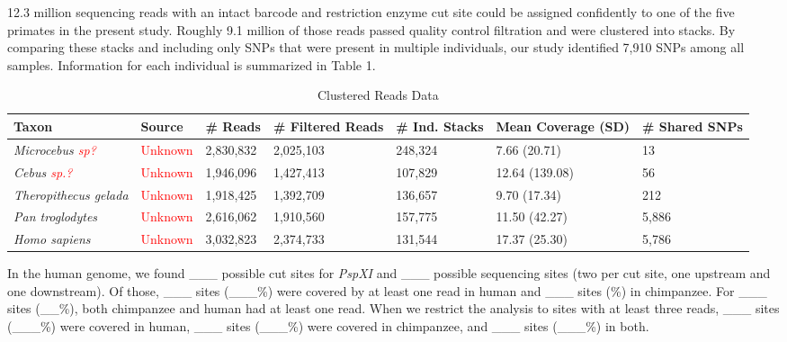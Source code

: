\documentclass[12pt]{article}
\begin{document}
12.3 million sequencing reads with an intact barcode and restriction enzyme cut site could be assigned confidently to one of the five primates in the present study. Roughly 9.1 million of those reads passed quality control filtration and were clustered into stacks. By comparing these stacks and including only SNPs that were present in multiple individuals, our study identified 7,910 SNPs among all samples. Information for each individual is summarized in Table 1. 

\begin{table}[h]
\caption{Clustered Reads Data}
\begin{center}
	\small
	\begin{tabular}{ p{3cm} || l || p{1.75cm} | p{1.75cm} || p{1.75cm} | p{1.75cm} | l }
		\hline
		Taxon                                  & Source                   & \# Reads & \# Filtered Reads & \# Ind. Stacks & Mean Coverage (SD)  & \# Shared SNPs \\ \hline\hline
		\emph{Microcebus \textcolor{red}{sp?}} & \textcolor{red}{Unknown} &  2,830,832 & 2,025,103       & 248,324         &  7.66 (20.71)  & 13 \\ \hline
		\emph{Cebus \textcolor{red}{sp.?}}     & \textcolor{red}{Unknown} &  1,946,096 & 1,427,413       & 107,829         & 12.64 (139.08) & 56 \\ \hline
		\emph{Theropithecus gelada}            & \textcolor{red}{Unknown} &  1,918,425 & 1,392,709       & 136,657         &  9.70 (17.34)  & 212 \\ \hline
		\emph{Pan troglodytes}                 & \textcolor{red}{Unknown} &  2,616,062 & 1,910,560       & 157,775         & 11.50 (42.27)  & 5,886 \\ \hline
		\emph{Homo sapiens}                    & \textcolor{red}{Unknown} &  3,032,823 & 2,374,733       & 131,544         & 17.37 (25.30)  & 5,786 \\ \hline
	\end{tabular}
\end{center}
\end{table}

In the human genome, we found \_\_\_ possible cut sites for \emph{PspXI} and \_\_\_ possible sequencing sites (two per cut site, one upstream and one downstream). Of those, \_\_\_ sites (\_\_\_\%) were covered by at least one read in human and \_\_\_ sites (\%) in chimpanzee. For \_\_\_ sites (\_\_\%), both chimpanzee and human had at least one read. When we restrict the analysis to sites with at least three reads, \_\_\_ sites (\_\_\_\%) were covered in human, \_\_\_ sites (\_\_\_\%) were covered in chimpanzee, and \_\_\_ sites (\_\_\_\%) in both.
\end{document}
